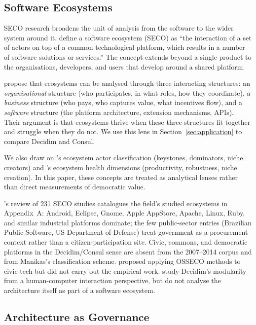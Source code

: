 \documentclass[11pt,a4paper]{article}
\begin{document}
\subsection{Software Ecosystems}\label{sec:seco}

SECO research broadens the unit of analysis from the software to the wider system around it. \citet{manikas2013systematic} define a software ecosystem (SECO) as ``the interaction of a set of actors on top of a common technological platform, which results in a number of software solutions or services.'' The concept extends beyond a single product to the organisations, developers, and users that develop around a shared platform.

\citet{christensen2014analysis} propose that ecosystems can be analysed through three interacting structures: an \emph{organisational} structure (who participates, in what roles, how they coordinate), a \emph{business} structure (who pays, who captures value, what incentives flow), and a \emph{software} structure (the platform architecture, extension mechanisms, APIs). Their argument is that ecosystems thrive when these three structures fit together and struggle when they do not. We use this lens in Section~\ref{sec:application} to compare Decidim and Consul.

We also draw on \citet{iansiti2004strategy}'s ecosystem actor classification (keystones, dominators, niche creators) and \citet{jansen2014measuring}'s ecosystem health dimensions (productivity, robustness, niche creation). In this paper, these concepts are treated as analytical lenses rather than direct measurements of democratic value.

\citet{manikas2016revisiting}'s review of 231 SECO studies catalogues the field's studied ecosystems in Appendix~A: Android, Eclipse, Gnome, Apple AppStore, Apache, Linux, Ruby, and similar industrial platforms dominate; the few public-sector entries (Brazilian Public Software, US Department of Defense) treat government as a procurement context rather than a citizen-participation site. Civic, commons, and democratic platforms in the Decidim/Consul sense are absent from the 2007--2014 corpus and from Manikas's classification scheme. \citet{knutas2020local} proposed applying OSSECO methods to civic tech but did not carry out the empirical work. \citet{palacin2024configurations} study Decidim's modularity from a human-computer interaction perspective, but do not analyse the architecture itself as part of a software ecosystem.

\subsection{Architecture as Governance}\label{sec:archgov}
\end{document}
